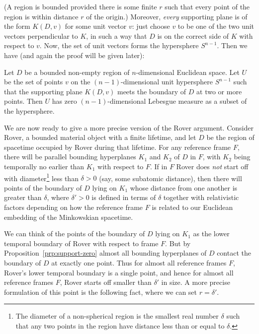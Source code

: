 (A region is bounded provided there is some finite $r$ such that every point of the region is within distance $r$ of the origin.) Moreover, \textit{every} supporting plane is of the form $K(D,v)$ for some unit vector $v$: just choose $v$ to be one of the two unit vectors perpendicular to $K$, in such a way that $D$ is on the correct side of $K$ with respect to $v$. Now, the set of unit vectors forms the hypersphere $S^{n-1}$. Then we have (and again the proof will be given later):

\begin{prp}\label{prp:support-zero}
Let $D$ be a bounded non-empty region of $n$-dimensional Euclidean space. Let $U$ be the set of points $v$ on the 
$(n-1)$-dimensional unit hypersphere $S^{n-1}$ such that the supporting plane $K(D,v)$ meets the boundary of $D$ at two or more points. Then $U$ has zero $(n-1)$-dimensional Lebesgue measure as a subset of the hypersphere.
\end{prp}

We are now ready to give a more precise version of the Rover argument. Consider Rover, a bounded material object with a finite lifetime, and let $D$ be the region of spacetime occupied by Rover during that lifetime.  For any reference frame $F$, there will be parallel bounding hyperplanes $K_1$ and $K_2$ of $D$ in $F$, with $K_2$ being temporally no earlier than $K_1$ with respect to $F$.  If in $F$ Rover does \textit{not} start off with diameter\footnote{The diameter of a non-spherical region is the smallest real number $\delta$ such that any two points in the region have distance less than or equal to $\delta$.} less than $\delta>0$ (say, some subatomic distance), then there will points of the boundary of $D$ lying on $K_1$ whose distance from one another is greater than $\delta$, where $\delta'>0$ is defined in terms of $\delta$ together with relativistic factors depending on how the reference frame $F$ is related to our Euclidean embedding of the Minkowskian spacetime.

We can think of the points of the boundary of $D$ lying on $K_1$ as the lower temporal boundary of Rover with respect to frame $F$.
But by Proposition~\ref{prp:support-zero} almost all bounding hyperplanes of $D$ contact the boundary of $D$ at exactly one point. Thus for almost all reference frames $F$, Rover's lower temporal boundary is a single point, and hence for almost all reference frames $F$, Rover starts off smaller than $\delta'$ in size. A more precise formulation of this point is the following fact, where we can set $r=\delta'$.

